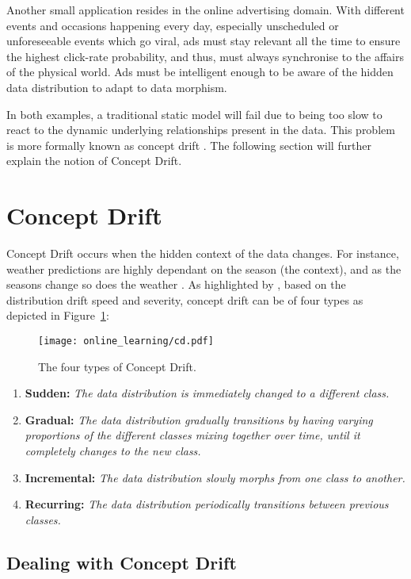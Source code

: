 Another small application resides in the online advertising domain. With different events and occasions happening every day, especially unscheduled or unforeseeable events which go viral, ads must stay relevant all the time to ensure the highest click-rate probability, and thus, must always synchronise to the affairs of the physical world. Ads must be intelligent enough to be aware of the hidden data distribution to adapt to data morphism.

In both examples, a traditional static model will fail due to being too slow to react to the dynamic underlying relationships present in the data. This problem is more formally known as concept drift \citep{schlimmer_incremental_1986}. The following section will further explain the notion of Concept Drift.

\section{Concept Drift}

Concept Drift occurs when the hidden context of the data changes. For instance, weather predictions are highly dependant on the season (the context), and as the seasons change so does the weather \citep{widmer_learning_1996}. As highlighted by \citet{krawczyk_online_2018, Gama2014ASO}, based on the distribution drift speed and severity, concept drift can be of four types as depicted in Figure~\ref{fig:cd}:

\begin{figure}
  \texttt{[image: online\_learning/cd.pdf]}
  \caption{The four types of Concept Drift.}
  \label{fig:cd}
\end{figure}

\begin{enumerate}
\item \textbf{Sudden:}
\textit{The data distribution is immediately changed to a different class.}
\item \textbf{Gradual:}
\textit{The data distribution gradually transitions by having varying proportions of the different classes mixing together over time, until it completely changes to the new class.}
\item \textbf{Incremental:}
\textit{The data distribution slowly morphs from one class to another.}
\item \textbf{Recurring:}
\textit{The data distribution periodically transitions between previous classes.}
\end{enumerate}

\subsection{Dealing with Concept Drift}

